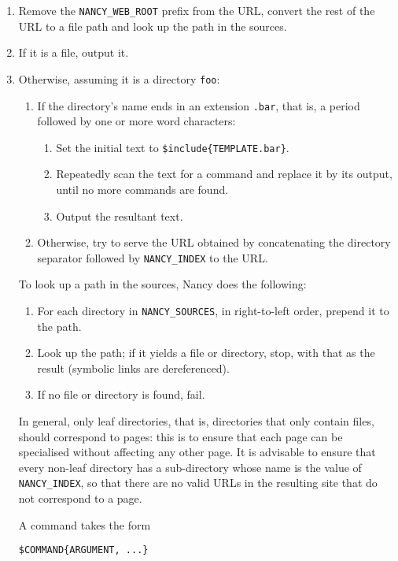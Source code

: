 \documentclass[english]{scrartcl}
\begin{document}
\begin{enumerate}
\item Remove the \verb|NANCY_WEB_ROOT| prefix from the URL, convert the rest of the URL to a file path and look up the path in the sources.
\item If it is a file, output it.
\item Otherwise, assuming it is a directory \verb|foo|:
\begin{enumerate}
\item If the directory’s name ends in an extension \verb|.bar|, that is, a period followed by one or more word characters:
\begin{enumerate}
\item Set the initial text to \verb|$include{TEMPLATE.bar}|.
\item Repeatedly scan the text for a command and replace it by its output, until no more commands are found.
\item Output the resultant text.
\end{enumerate}
\item Otherwise, try to serve the URL obtained by concatenating the directory separator followed by \verb|NANCY_INDEX| to the URL.
\end{enumerate}

To look up a path in the sources, Nancy does the following:

\begin{enumerate}
\item For each directory in \verb|NANCY_SOURCES|, in right-to-left order, prepend it to the path.
\item Look up the path; if it yields a file or directory, stop, with that as the result (symbolic links are dereferenced).
\item If no file or directory is found, fail.
\end{enumerate}

In general, only leaf directories, that is, directories that only contain files, should correspond to pages: this is to ensure that each page can be specialised without affecting any other page. It is advisable to ensure that every non-leaf directory has a sub-directory whose name is the value of \verb|NANCY_INDEX|, so that there are no valid URLs in the resulting site that do not correspond to a page.

A command takes the form

\begin{verbatim}
$COMMAND{ARGUMENT, ...}
\end{verbatim}


\end{enumerate}
\end{document}
